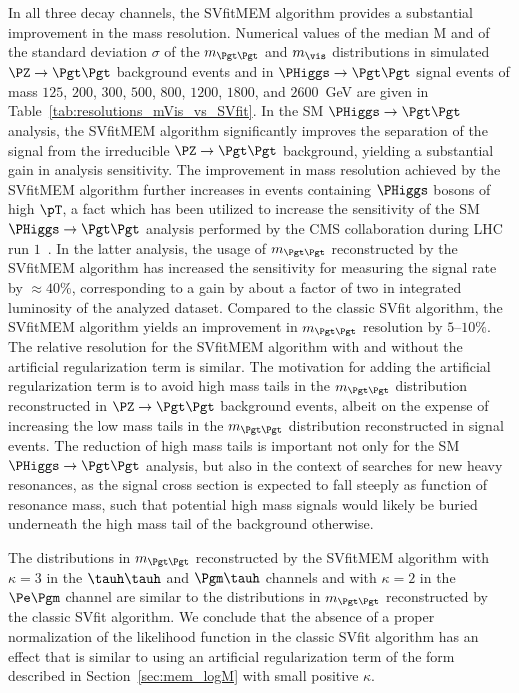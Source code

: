 {{{{{In all three decay channels, the SVfitMEM algorithm provides a substantial improvement in the mass resolution.
Numerical values of the median $\textrm{M}$ and of the standard deviation $\sigma$ 
of the $m_{\Pgt\Pgt}$ and $m_{\vis}$ distributions in simulated $\PZ \to \Pgt\Pgt$ background events
and in $\PHiggs \to \Pgt\Pgt$ signal events of mass $125$, $200$, $300$, $500$, $800$, $1200$, $1800$, and $2600$~GeV
are given in Table~\ref{tab:resolutions_mVis_vs_SVfit}.
In the SM $\PHiggs \to \Pgt\Pgt$ analysis,
the SVfitMEM algorithm significantly improves the separation of the signal 
from the irreducible $\PZ \to \Pgt\Pgt$ background, yielding a substantial gain in analysis sensitivity.
The improvement in mass resolution achieved by the SVfitMEM algorithm
further increases in events containing $\PHiggs$ bosons of high $\pT$,
a fact which has been utilized to increase the sensitivity of the SM $\PHiggs \to \Pgt\Pgt$ analysis performed by the CMS collaboration during LHC run $1$~\cite{HIG-13-004}.
In the latter analysis, the usage of $m_{\Pgt\Pgt}$ reconstructed by the SVfitMEM algorithm
has increased the sensitivity for measuring the signal rate by $\approx 40\%$,
corresponding to a gain by about a factor of two in integrated luminosity of the analyzed dataset.
Compared to the classic SVfit algorithm, the SVfitMEM algorithm yields an improvement in $m_{\Pgt\Pgt}$ resolution by $5$--$10\%$.
The relative resolution for the SVfitMEM algorithm with and without the artificial regularization term is similar.
The motivation for adding the artificial regularization term is to avoid high mass tails in the $m_{\Pgt\Pgt}$ distribution
reconstructed in $\PZ \to \Pgt\Pgt$ background events,
albeit on the expense of increasing the low mass tails in the $m_{\Pgt\Pgt}$ distribution reconstructed in signal events.
The reduction of high mass tails is important not only for the SM $\PHiggs \to \Pgt\Pgt$ analysis,
but also in the context of searches for new heavy resonances,
as the signal cross section is expected to fall steeply as function of resonance mass,
such that potential high mass signals would likely be buried underneath the high mass tail of the background otherwise.

The distributions in $m_{\Pgt\Pgt}$ reconstructed by the SVfitMEM
algorithm with $\kappa = 3$ in the $\tauh\tauh$ and $\Pgm\tauh$ channels and with $\kappa = 2$ in the $\Pe\Pgm$ channel
are similar to the distributions in $m_{\Pgt\Pgt}$ reconstructed by the classic SVfit algorithm.
We conclude that the absence of a proper normalization of the likelihood function in the classic SVfit algorithm
has an effect that is similar to using an artificial regularization term of the form described in Section~\ref{sec:mem_logM} with small positive $\kappa$.

}}}}}
